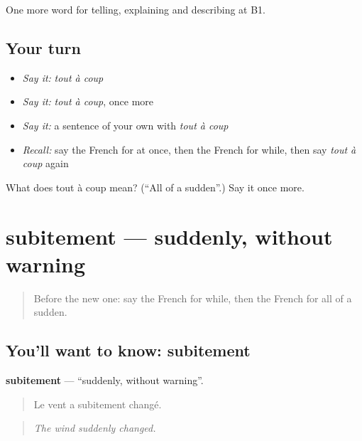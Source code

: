\begin{grammarlens}[title={What you've built}]
One more word for telling, explaining and describing at B1.
\end{grammarlens}

\subsection*{Your turn}
\begin{itemize}
\raggedright
  \item \emph{Say it:} \emph{tout à coup}
  \item \emph{Say it:} \emph{tout à coup}, once more
  \item \emph{Say it:} a sentence of your own with \emph{tout à coup}
  \item \emph{Recall:} say the French for at once, then the French for while, then say \emph{tout à coup} again
\end{itemize}

\begin{tcolorbox}[breakable,colback=teal!4,colframe=teal!35!black,title={Before you move on}]
What does tout à coup mean? (\textquotedblleft{}All of a sudden\textquotedblright{}.) Say it once more.
\end{tcolorbox}
\section[subitement]{subitement — suddenly, without warning}

\label{lesson:FR-C270-subitement}



\begin{quote}
Before the new one: say the French for while, then the French for all of a sudden.
\end{quote}

\subsection*{You'll want to know: subitement}
\textbf{subitement} — \textquotedblleft{}suddenly, without warning\textquotedblright{}.

\begin{quote}
Le vent a subitement changé.
\end{quote}

\begin{quote}
\emph{The wind suddenly changed.}
\end{quote}

